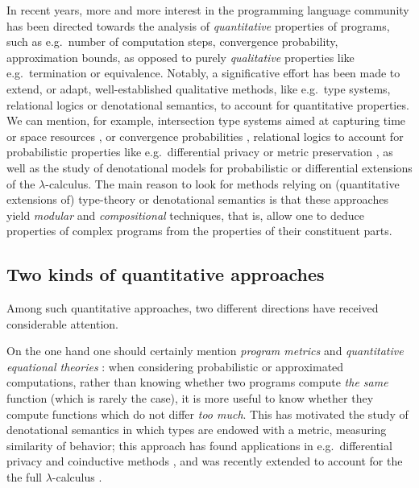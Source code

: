 
In recent years, more and more interest in the programming language community has been directed towards the analysis of \emph{quantitative} properties of programs, such as e.g.~number of computation steps, convergence probability, 
approximation bounds, 
as opposed to purely \emph{qualitative} properties like e.g.~termination or equivalence. 
Notably, a significative effort has been made to extend, or adapt, well-established qualitative methods, like e.g.~type systems, relational logics or denotational semantics, to account for quantitative properties. We can mention, for example, 
intersection type systems aimed at capturing time or space resources \cite{decarvalho2018, Accattoli2022}, or convergence probabilities \cite{Breuvart2018, PistoneLICS2022},  relational logics to account for probabilistic properties like e.g.~differential privacy \cite{Barthe_2012} or metric preservation \cite{Reed2010, dallago}, as well as the study of denotational models for 
probabilistic \cite{Ehrhard2011, Staton2017} or differential \cite{difflambda} extensions of the $\lambda$-calculus. 
The main reason to look for methods relying on (quantitative extensions of) type-theory or denotational semantics is that these approaches yield \emph{modular} and \emph{compositional} techniques, that is, allow one to deduce properties of complex programs from the properties of their constituent parts.   

\subsection{Two kinds of quantitative approaches}

Among such quantitative approaches, two different directions have received considerable attention. 

On the one hand one should certainly mention \emph{program metrics} \cite{Reed2010, Gaboardi2017, Gabo2019} and \emph{quantitative equational theories} \cite{Plotk}: when considering probabilistic or approximated computations, rather than knowing whether two programs compute \emph{the same} function (which is rarely the case), it is more useful to know whether they compute functions which do not differ \emph{too much}. This has motivated the study of denotational semantics in which types are endowed with a metric, measuring similarity of behavior; this approach has found  applications in e.g.~differential privacy \cite{Reed2010} and coinductive methods \cite{Bonchi2018}, and was recently extended to account for the the full $\lambda$-calculus \cite{Geoffroy2020, PistoneLICS, PistoneFSCD2022}.

